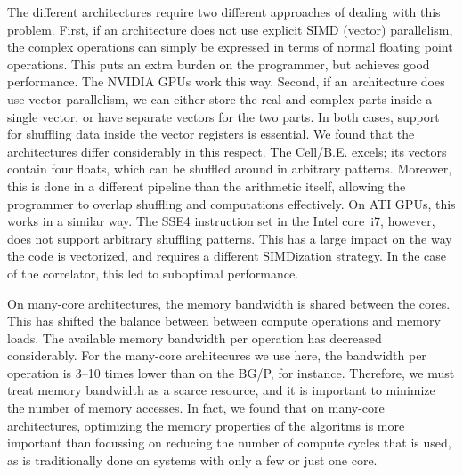 \documentclass{article}
\begin{document}
The different architectures require two different approaches of
dealing with this problem. First, if an architecture does not use
explicit SIMD (vector) parallelism, the complex operations can simply
be expressed in terms of normal floating point operations. This puts
an extra burden on the programmer, but achieves good performance. The
NVIDIA GPUs work this way.  Second, if an architecture does use vector
parallelism, we can either store the real and complex parts inside a
single vector, or have separate vectors for the two parts.  In both
cases, support for shuffling data inside the vector registers is
essential. We found that the architectures differ considerably in this
respect.  The Cell/B.E. excels; its vectors contain four floats, which
can be shuffled around in arbitrary patterns. Moreover, this is done
in a different pipeline than the arithmetic itself, allowing the
programmer to overlap shuffling and computations effectively.  On ATI
GPUs, this works in a similar way.  The SSE4 instruction set in the
Intel core~i7, however, does not support arbitrary shuffling patterns.
This has a large impact on the way the code is vectorized, and
requires a different SIMDization strategy. In the case of the
correlator, this led to suboptimal performance.




On many-core architectures, the memory bandwidth is shared between the
cores.  This has shifted the balance between between compute
operations and memory loads.  The available memory bandwidth per
operation has decreased considerably.  For the many-core architecures
we use here, the bandwidth per operation is 3--10 times lower than on
the BG/P, for instance.  Therefore, we must treat memory bandwidth as
a scarce resource, and it is important to minimize the number of
memory accesses.  In fact, we found that on many-core architectures,
optimizing the memory properties of the algoritms is more important
than focussing on reducing the number of compute cycles that is used,
as is traditionally done on systems with only a few or just one core.
\end{document}
